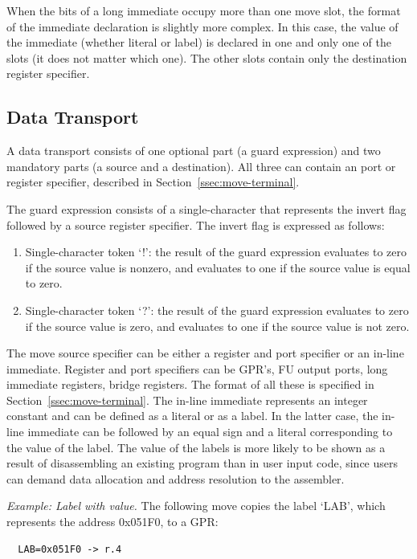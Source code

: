 \documentclass[twoside]{tceusermanual}
\begin{document}
When the bits of a long immediate occupy more than one move slot, the format
of the immediate declaration is slightly more complex.  In this case, the
value of the immediate (whether literal or label) is declared in one and
only one of the slots (it does not matter which one). The other slots
contain only the destination register specifier.

\subsection{Data Transport}

A data transport consists of one optional part (a guard expression) and two
mandatory parts (a source and a destination). All three can contain an port
or register specifier, described in Section~\ref{ssec:move-terminal}.

The guard expression consists of a single-character that represents the
invert flag followed by a source register specifier. The invert flag is
expressed as follows:
\begin{enumerate}
\item %
  Single-character token `!': the result of the guard expression evaluates
  to zero if the source value is nonzero, and evaluates to one if the source
  value is equal to zero.
\item %
  Single-character token `?': the result of the guard expression evaluates
  to zero if the source value is zero, and evaluates to one if the source
  value is not zero.
\end{enumerate}

The move source specifier can be either a register and port specifier or an
in-line immediate. Register and port specifiers can be GPR's, FU output
ports, long immediate registers, bridge registers. The format of all these
is specified in Section~\ref{ssec:move-terminal}.
%
The in-line immediate represents an integer constant and can be defined as a
literal or as a label. In the latter case, the in-line immediate can be
followed by an equal sign and a literal corresponding to the value of the
label.  The value of the labels is more likely to be shown as a result of
disassembling an existing program than in user input code, since users can
demand data allocation and address resolution to the assembler.

\emph{Example: Label with value.}
%
The following move copies the label `LAB', which represents the address
0x051F0, to a GPR:
\begin{verbatim}
  LAB=0x051F0 -> r.4
\end{verbatim}
\end{document}
